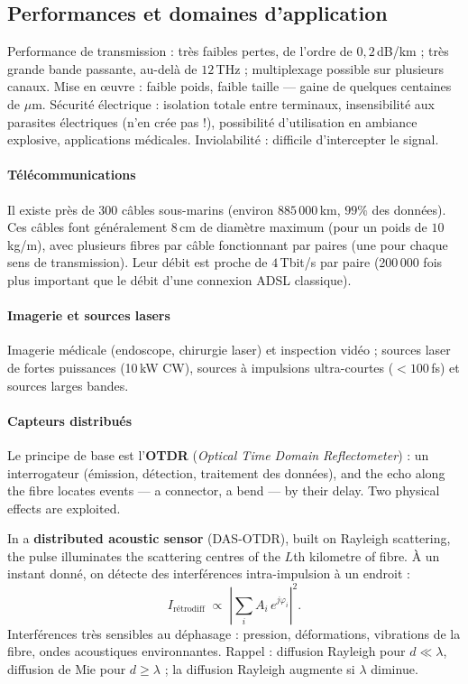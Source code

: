 \subsection{Performances et domaines d'application}

\begin{conclusion}
  Performance de transmission : très faibles pertes, de l'ordre de
  $0{,}2$\,dB/km ; très grande bande passante, au-delà de $12$\,THz ;
  multiplexage possible sur plusieurs canaux. Mise en œuvre : faible poids,
  faible taille --- gaine de quelques centaines de $\mu$m. Sécurité électrique :
  isolation totale entre terminaux, insensibilité aux parasites électriques
  (n'en crée pas !), possibilité d'utilisation en ambiance explosive,
  applications médicales. Inviolabilité : difficile d'intercepter le signal.
\end{conclusion}

\paragraph{Télécommunications} Il existe près de 300 câbles sous-marins
(environ $885\,000$\,km, $99\%$ des données). Ces câbles font généralement
$8$\,cm de diamètre maximum (pour un poids de $10$\,kg/m), avec plusieurs
fibres par câble fonctionnant par paires (une pour chaque sens de
transmission). Leur débit est proche de $4$\,Tbit/s par paire (200\,000 fois
plus important que le débit d'une connexion ADSL classique).

\paragraph{Imagerie et sources lasers} Imagerie médicale (endoscope, chirurgie
laser) et inspection vidéo ; sources laser de fortes puissances (10\,kW CW),
sources à impulsions ultra-courtes ($< 100$\,fs) et sources larges bandes.

\paragraph{Capteurs distribués} Le principe de base est l'\textbf{OTDR}
(\textit{Optical Time Domain Reflectometer}) : un interrogateur (émission,
détection, traitement des données), and the echo along the fibre locates
events --- a connector, a bend --- by their delay. Two physical effects are
exploited.

In a \textbf{distributed acoustic sensor} (DAS-OTDR), built on Rayleigh
scattering, the pulse illuminates the scattering centres of the $L$th kilometre
of fibre. À un instant donné, on détecte des interférences intra-impulsion à
un endroit :
\begin{equation*}
  I_{\text{rétrodiff}} \;\propto\;
  \left|\sum_i A_i\,e^{j\varphi_i}\right|^2 .
\end{equation*}
Interférences très sensibles au déphasage : pression, déformations, vibrations
de la fibre, ondes acoustiques environnantes. Rappel : diffusion Rayleigh pour
$d \ll \lambda$, diffusion de Mie pour $d \geq \lambda$ ; la diffusion
Rayleigh augmente si $\lambda$ diminue.\\

